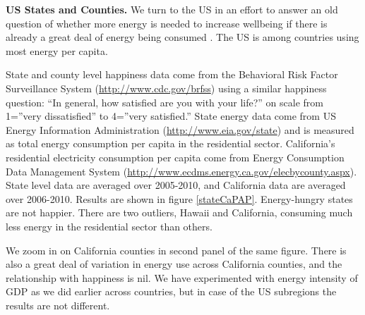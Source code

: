\documentclass[10pt, letterpaper]{article}
\begin{document}
\begin{spacing}{1.0}
\textbf{US States and Counties.} We turn to the US in an effort to answer
an old question of whether more energy is needed to increase wellbeing if there
is already a great deal of energy being consumed \citep{mazur74}. The US is among
countries using most energy per capita.
%

State and county level happiness data come from the Behavioral Risk Factor
Surveillance System (\url{http://www.cdc.gov/brfss}) using a similar happiness question: ``In general,
how satisfied are you with your life?'' on scale 
from 1=''very dissatisfied'' to 4=''very satisfied.'' State energy  data come from
US Energy Information Administration (\url{http://www.eia.gov/state})  and is measured as total energy
consumption per capita in the residential sector.  
California's  residential electricity consumption per capita come from 
Energy Consumption Data Management System
(\url{http://www.ecdms.energy.ca.gov/elecbycounty.aspx}). State level data are
averaged over 2005-2010, and California data are
averaged over 2006-2010.
Results are shown in
figure \ref{stateCaPAP}. Energy-hungry states  are not happier. %
 There are two outliers, Hawaii and California, consuming much less energy in
the residential sector than others. 

We zoom in on California counties in
second panel of the same figure. There is also a great deal of variation in energy
use across California counties, and the relationship with happiness is nil. 
We have  experimented with energy intensity of
GDP as we did earlier across countries, but in case of the US subregions the results are
not different. %


\end{spacing}
\end{document}

